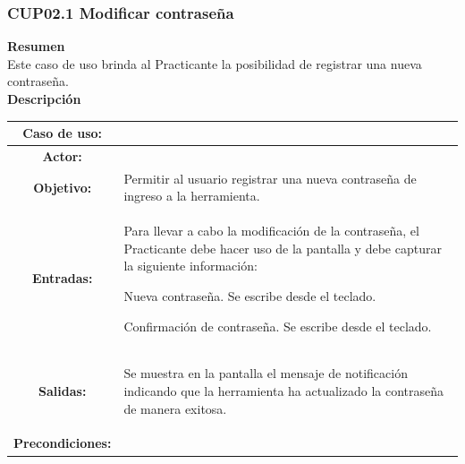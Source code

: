 \subsubsection{CUP02.1 Modificar contraseña}
\label{cu:CUP02.1}

\textbf{\textcolor[rgb]{0, 0, 0.545098}{Resumen}} \\

Este caso de uso brinda al Practicante la posibilidad de registrar una nueva contraseña. \\

\textbf{\textcolor[rgb]{0, 0, 0.545098}{Descripción}} \\

\begin{table}[H]
\centering
\begin{tabular}{| c | p{12 cm} |}
\hline
\rowcolor[rgb]{0.529412, 0.807843, 0.980392}  {\textbf{Caso de uso:}} & \hspace{7em}{\textbf{CUP02.1: Modificar contraseña}}\\
\hline
\textbf{Actor:} & \nameref{act:Practicante} \\
\hline
\textbf{Objetivo:} & Permitir al usuario registrar una nueva contraseña de ingreso a la herramienta.\\
\hline
\textbf{Entradas:} & Para llevar a cabo la modificación de la contraseña, el Practicante debe hacer uso de la pantalla \nameref{pant:IUP02.1} y debe capturar la siguiente información:
	\begin{compactitem} 
			\setlength\itemsep{-0.25em}
			\item Nueva contraseña. Se escribe desde el teclado.
			\item Confirmación de contraseña. Se escribe desde el teclado.
	\end{compactitem} \\
\hline
\textbf{Salidas:} & \vspace{-2mm}	%
					\begin{compactitem}
						\setlength\itemsep{-0.25em}
						\item Se muestra en la pantalla \nameref{pant:IUP02.1} el mensaje de notificación \nameref{msj:MSG01} indicando que la herramienta ha actualizado la contraseña de manera exitosa.
					\end{compactitem}\\
\hline
\textbf{Precondiciones:} & \vspace{-2mm}	%

\end{tabular}
\end{table}
